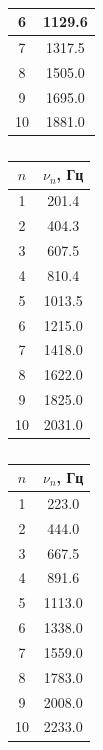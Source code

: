\documentclass[a4paper]{article}
\begin{document}
\begin{itemize}
\begin{table}[]
\begin{minipage}{0.19 \linewidth}
\begin{tabular}{|c|c|}
6   & 1129.6    \\ \hline
7   & 1317.5    \\ \hline
8   & 1505.0      \\ \hline
9   & 1695.0      \\ \hline
10  & 1881.0      \\ \hline
\end{tabular}
\caption{}
\end{minipage}
\begin{minipage}{0.19 \linewidth}
\centering
\begin{tabular}{|c|c|}
\hline
$n$ & $\nu_n$, Гц \\ \hline
1   & 201.4     \\ \hline
2   & 404.3     \\ \hline
3   & 607.5     \\ \hline
4   & 810.4     \\ \hline
5   & 1013.5    \\ \hline
6   & 1215.0      \\ \hline
7   & 1418.0      \\ \hline
8   & 1622.0      \\ \hline
9   & 1825.0      \\ \hline
10  & 2031.0      \\ \hline
\end{tabular}
\caption{}
\end{minipage}
\begin{minipage}{0.19 \linewidth}
\centering
\begin{tabular}{|c|c|}
\hline
$n$ & $\nu_n$, Гц \\ \hline
1   & 223.0       \\ \hline
2   & 444.0       \\ \hline
3   & 667.5     \\ \hline
4   & 891.6     \\ \hline
5   & 1113.0      \\ \hline
6   & 1338.0      \\ \hline
7   & 1559.0      \\ \hline
8   & 1783.0      \\ \hline
9   & 2008.0      \\ \hline
10  & 2233.0          \\ \hline
\end{tabular}
\caption{}
\end{minipage}
\end{table}
\begin{table}
\centering

\end{table}
\end{itemize}
\end{document}
